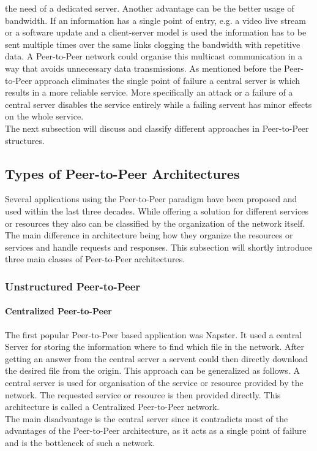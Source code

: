 the need of a dedicated server. Another advantage can be the better
usage of bandwidth. If an information has a single point of entry,
e.g. a video live stream or a software update and a client-server model is used
the information has to be sent multiple times over the same links clogging the
bandwidth with repetitive data. A Peer-to-Peer network could organise this
multicast communication in a way that avoids unnecessary data transmissions. As
mentioned before the Peer-to-Peer approach eliminates the single point of
failure a central server is which results in a more reliable service. More
specifically an attack or a failure of a central server disables the service
entirely while a failing servent has minor effects on the whole service.
\\
The next subsection will discuss and classify different approaches in Peer-to-Peer
structures.
\subsection{Types of Peer-to-Peer Architectures}
Several applications using the Peer-to-Peer paradigm have been proposed and used
within the last three decades. While offering a solution for different services
or resources they also can be classified by the organization of the network
itself. The main difference in architecture being how they organize the
resources or services and handle requests and responses. This subsection will
shortly introduce three main classes of Peer-to-Peer architectures.
\subsubsection{Unstructured Peer-to-Peer}
\paragraph{Centralized Peer-to-Peer}
The first popular Peer-to-Peer based application was Napster. It used a
central Server for storing the information where to find which file in the
network. After getting an answer from the central server a servent could then
directly download the desired file from the origin. This approach can be
generalized as follows. A central server is used for organisation
of the service or resource provided by the network. The requested service or
resource is then provided directly. This architecture is called a
Centralized Peer-to-Peer network.
\\
The main disadvantage is the central server since it contradicts most of the
 advantages of the Peer-to-Peer architecture, as it acts as a single point of 
failure and is the bottleneck of such a network.
